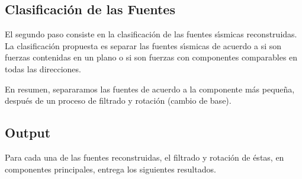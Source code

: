 \subsection{Clasificaci\'on de las Fuentes}

El segundo paso consiste en la clasificaci\'on de las fuentes s\'{\i}smicas reconstruidas.
La clasificaci\'on propuesta es separar las fuentes s\'{\i}smicas de acuerdo a si son
fuerzas contenidas en un plano o si son fuerzas con componentes
comparables en todas las direcciones.

En resumen, separaramos las fuentes de acuerdo a la componente m\'as peque\~na,
despu\'es de un proceso de filtrado y rotaci\'on (cambio de base).

\subsection{Output}

Para cada una de las fuentes reconstruidas, el filtrado y rotaci\'on de \'estas, en
componentes principales, entrega los siguientes resultados.

